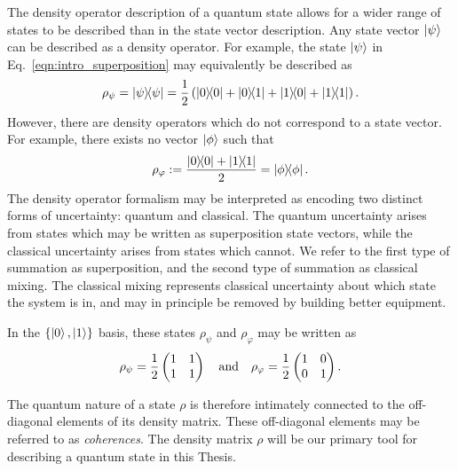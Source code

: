 The density operator description of a quantum state allows for a wider range of states to be described than in the state vector description. Any state vector $\ket{\psi}$ can be described as a density operator. For example, the state $\ket{\psi}$ in Eq.~\ref{eqn:intro_superposition} may equivalently be described as 
\begin{equation}
\rho_\psi = \dyad{\psi}{\psi} = \frac{1}{2} \left(\dyad{0}{0} + \dyad{0}{1} + \dyad{1}{0} + \dyad{1}{1} \right).
\end{equation}
However, there are density operators which do not correspond to a state vector. For example, there exists no vector $\ket{\phi}$ such that
\begin{equation}\label{sec:intro_mixture}
\rho_{\varphi} := \frac{\dyad{0}{0} + \dyad{1}{1}}{2} = \dyad{\phi}.
\end{equation}
The density operator formalism may be interpreted as encoding two distinct forms of uncertainty: quantum and classical. The quantum uncertainty arises from states which may be written as superposition state vectors, while the classical uncertainty arises from states which cannot. We refer to the first type of summation as superposition, and the second type of summation as classical mixing. The classical mixing represents classical uncertainty about which state the system is in, and may in principle be removed by building better equipment.

In the $\left\{\ket{0}, \ket{1}\right\}$ basis, these states $\rho_\psi$ and $\rho_\varphi$ may be written as
\begin{equation}
\rho_\psi = \frac{1}{2}\pmqty{1 & 1 \\ 1 & 1} \qq{and} \rho_\varphi = \frac{1}{2}\pmqty{1 & 0 \\ 0  & 1}.
\end{equation}

\noindent The quantum nature of a state $\rho$ is therefore intimately connected to the off-diagonal elements of its density matrix. These off-diagonal elements may be referred to as \emph{coherences}. The density matrix $\rho$ will be our primary tool for describing a quantum state in this Thesis.



